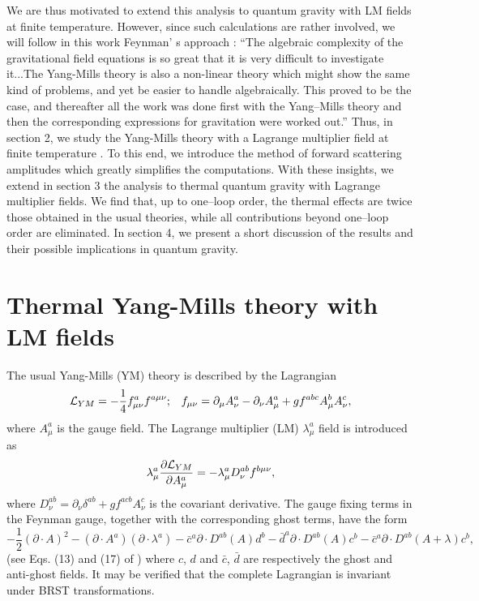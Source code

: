 \documentclass[longbibliography,groupedaddress,showpacs,showkeys,amssymb,eqsecnum,aps,nofootinbib,superscriptaddress]{revtex4}
\newcommand{\be}{\begin{equation}}
\newcommand{\ee}{\end{equation}}
\begin{document}
We are thus motivated to extend this analysis to quantum gravity with LM fields at finite 
temperature. However,  since such calculations are rather involved, we
will follow in this work Feynman' s approach \cite{Klauder:1972lsv} :
``The algebraic complexity of the gravitational field equations is so great that it is very difficult to investigate it...The Yang-Mills theory is also a non-linear theory which might show the same kind of problems, and yet be easier to handle algebraically. This proved to be the case, and thereafter all the work was done first with the Yang--Mills theory and then the corresponding expressions for gravitation were worked out.''    
Thus, in section 2, we study the Yang-Mills theory with a Lagrange multiplier field at finite
temperature
\cite{Braaten:1990mz,Frenkel:1989br,lebellac:book96,kapusta}.
To this end, we introduce the method of
forward scattering amplitudes \cite{Frenkel:1989br, Barton:1990fk} which greatly simplifies 
the computations. With these insights, we extend in section 3 the
analysis to thermal quantum gravity with Lagrange multiplier fields. 
We find that, up to one--loop order, the thermal effects are twice
those obtained in the usual theories,  while all  contributions beyond
one--loop order are eliminated.  In section 4,  we present a short
discussion of the results and their possible implications in quantum gravity. 


\section{Thermal Yang-Mills theory with LM fields}

The usual Yang-Mills (YM)  theory is described by the Lagrangian
\be\label{e1}
{\cal L}_{YM}=-\frac 1 4 f^a_{\mu\nu} f^{a\mu\nu};\;\;\;
f_{\mu\nu} = 
\partial_\mu A_\nu^a - \partial_\nu A_\mu^a +
g f^{abc} A_\mu^b A_\nu^c ,
\ee
where $A_\mu^a$ is the gauge field. 
The Lagrange multiplier (LM) $\lambda_\mu^a$  field is introduced as   
\be\label{e2}
\lambda_\mu^a \frac{\partial {{\cal L}_{YM}}}{\partial A^a_\mu}
= -\lambda_\mu^a D^{ab}_\nu f^{b\mu\nu} ,
\ee
where $D^{ab}_\nu = \partial_\nu \delta^{ab} + g f^{acb} A^c_\nu$ is the covariant derivative.
The gauge fixing terms in the Feynman gauge,  together with the corresponding ghost terms, have the form 
\be\label{e3}
-\frac 1 2 (\partial\cdot A)^2  - (\partial\cdot A^a)
(\partial\cdot\lambda^a) 
-{\bar c}^a \partial\cdot D^{ab}(A) d^b
-{\bar d}^a \partial\cdot D^{ab}(A) c^b
-{\bar c}^a \partial\cdot D^{ab}(A+\lambda) c^b,
\ee
(see Eqs. (13) and (17) of \cite{McKeon:1992rq}) 
where $c$, $d$ and $\bar c$,  $\bar d$   
are respectively the ghost and anti-ghost fields. 
It may be verified that the complete 
Lagrangian is invariant under BRST transformations.          
\end{document}
